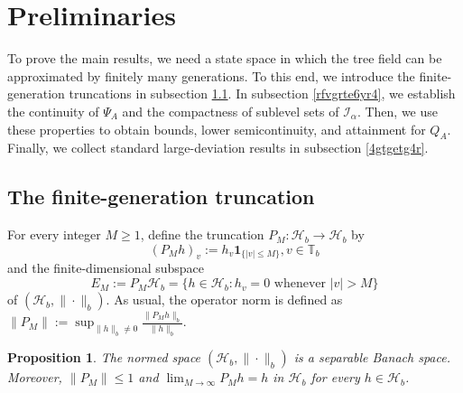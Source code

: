 \documentclass[a4paper, 11pt]{article}
\newcommand{\1}{\mathbf 1}
\theoremstyle{plain}
\newtheorem{proposition}[theorem]{Proposition}
\begin{document}
\section{Preliminaries}\label{sec:preliminaries}
To prove the main results, we need a state space in which
the tree field can be approximated by finitely many generations.
To this end, we introduce the finite-generation truncations in subsection \ref{4berhhyh6r}. In subsection
\ref{rfvgrte6yr4}, we establish the continuity of \(\Psi_A\)
and the compactness of sublevel sets of \(\mathcal{I_{\alpha}}\). Then, we use these
properties to obtain bounds, lower semicontinuity, and attainment for \(Q_A\).
Finally, we collect standard large-deviation results in subsection \ref{4gtgetg4r}.

\subsection{The finite-generation
truncation}\label{4berhhyh6r}

For every integer \(M\geq1\), define the truncation \(P_M:\mathcal{H}_b\to\mathcal{H}_b\) by
\[
  (P_Mh)_v:=h_v\mathbf{1}_{\{|v|\leq M\}}, {v\in\mathbb{T}_b}
\]
and the finite-dimensional subspace
\begin{equation}\label{eq:EM}
  E_M:=P_M\mathcal{H}_b
  =
  \{h\in\mathcal{H}_b:h_v=0\text{ whenever }|v|>M\}
\end{equation}
of \((\mathcal{H}_b,\|\cdot\|_b)\). As usual, the operator norm is defined as $\|P_M\|:=\sup_{\|h\|_{b}\neq 0}\frac{\|P_Mh\|_b}{\|h\|_b}.$
\par
\begin{proposition}\label{prop:Hb-Banach}
The normed space \((\mathcal{H}_b,\|\cdot\|_b)\) is a separable Banach space.
Moreover, \(\|P_M\|\leq1\) and \(\lim_{M\to\infty}P_Mh=h\) in \(\mathcal{H}_b\) for every
\(h\in\mathcal{H}_b\).
\end{proposition}
\end{document}
